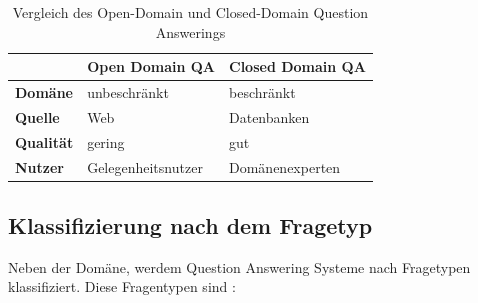 \documentclass[
        ngerman,
        paper=a4,
        numbers=noendperiod,
]{scrreprt}
\begin{document}
\begin{table}[H]
{\small
    \begin{tabularx}{\textwidth}{X|X|X} 
    
                  &\textbf{Open Domain QA}  & \textbf{Closed Domain QA}  \\ 
\hline    
    \textbf{Domäne}      & unbeschränkt        & beschränkt         \\ 
    \textbf{Quelle}   & Web        & Datenbanken          \\ 
    \textbf{Qualität} & gering        & gut           \\ 
    \textbf{Nutzer} & Gelegenheitsnutzer        & Domänenexperten           \\ 
    \end{tabularx}
\caption{Vergleich des Open-Domain und Closed-Domain Question Answerings}
    \label{tab:tab1}
}
\end{table}


\subsection{Klassifizierung nach dem Fragetyp}

Neben der Domäne, werdem Question Answering Systeme nach Fragetypen klassifiziert. Diese Fragentypen sind \citep[S. 20-21]{ChandraASystem}:
\end{document}
